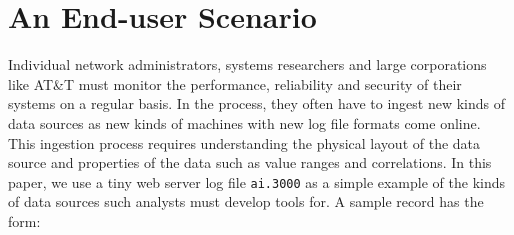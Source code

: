 \documentclass[preprint]{sig-alternate-sigmod08}
\begin{document}


\section{An End-user Scenario}

Individual network administrators, systems researchers and large 
corporations like AT\&T must monitor the performance,
reliability and security of their systems on a regular basis.
In the process, they often have to ingest new kinds of data
sources as new kinds of machines with new log file formats come
online.  This ingestion process requires understanding the physical
layout of the data source and properties of the data such as value
ranges and correlations.  In this paper, we use a tiny
web server log file {\tt ai.3000} as a simple example of the kinds of
data sources such analysts must develop tools for. A sample record has
the form:

\end{document}

